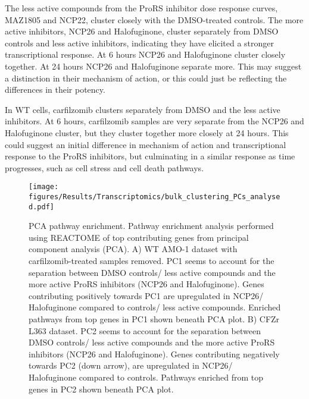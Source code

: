 The less active compounds from the ProRS inhibitor dose response curves, MAZ1805 and NCP22, cluster closely with the DMSO-treated controls.
The more active inhibitors, NCP26 and Halofuginone, cluster separately from DMSO controls and less active inhibitors, indicating they have elicited a stronger transcriptional response.
At 6 hours NCP26 and Halofuginone cluster closely together.
At 24 hours NCP26 and Halofuginone separate more.
This may suggest a distinction in their mechanism of action, or this could just be reflecting the differences in their potency.

In WT cells, carfilzomib clusters separately from DMSO and the less active inhibitors.
At 6 hours, carfilzomib samples are very separate from the NCP26 and Halofuginone cluster, but they cluster together more closely at 24 hours.
This could suggest an initial difference in mechanism of action and transcriptional response to the ProRS inhibitors, but culminating in a similar response as time progresses, such as cell stress and cell death pathways.

\begin{figure}[htb]
\centering
\texttt{[image: figures/Results/Transcriptomics/bulk\_clustering\_PCs\_analysed.pdf]}
\caption[PCA pathway enrichment]{PCA pathway enrichment.
Pathway enrichment analysis performed using REACTOME of top contributing genes from principal component analysis (PCA).
A) WT AMO-1 dataset with carfilzomib-treated samples removed.
PC1 seems to account for the separation between DMSO controls/ less active compounds and the more active ProRS inhibitors (NCP26 and Halofuginone).
Genes contributing positively towards PC1 are upregulated in NCP26/ Halofuginone compared to controls/ less active compounds.
Enriched pathways from top genes in PC1 shown beneath PCA plot.
B) CFZr L363 dataset.
PC2 seems to account for the separation between DMSO controls/ less active compounds and the more active ProRS inhibitors (NCP26 and Halofuginone).
Genes contributing negatively towards PC2 (down arrow), are upregulated in NCP26/ Halofuginone compared to controls.
Pathways enriched from top genes in PC2 shown beneath PCA plot.}
\label{fig:pca_pathway}
\end{figure}

